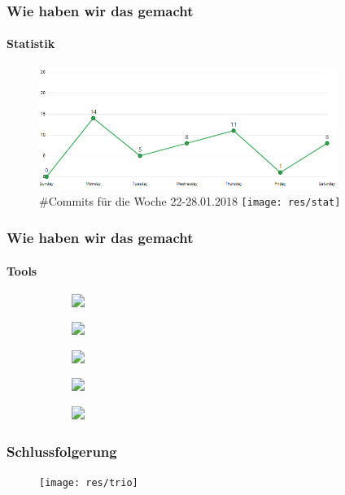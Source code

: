 \documentclass{beamer}
\begin{document}
\begin{frame}
	
	\frametitle{Wie haben wir das gemacht}
	\framesubtitle{Statistik}
	\begin{figure}
		
		\includegraphics[width=.8\textwidth, height = 4cm]{res/git_stat}\newline \vspace{0.3cm}
		\#Commits für die Woche 22-28.01.2018
		\texttt{[image: res/stat]}
	\end{figure}
	
\end{frame}
\begin{frame}
	\frametitle{Wie haben wir das gemacht}
	\framesubtitle{Tools}
	\begin{figure} \centering
		\begin{subfigure}[t]{\linewidth}
			\includegraphics<1-4>[width=60mm]{res/eclipse}
		\end{subfigure} %
		
		\begin{subfigure}[t]{\linewidth}    
			\includegraphics<1-4>[width=30mm]{res/pydev}
		\end{subfigure} 
		\vspace{-0.5cm}
		
		\begin{subfigure}[h]{\linewidth}    
			\includegraphics<2-4>[width=40mm, right]{res/latex}
		\end{subfigure} 
		\vspace{-1cm}
		
		\begin{subfigure}[b]{\linewidth}    
			\includegraphics<3-4>[width=40mm]{res/git} 
		\end{subfigure} 
		\vspace{-1cm}
		
		\begin{subfigure}[t]{\linewidth}    
			\includegraphics<4>[width=25mm, center]{res/trello}  
		\end{subfigure} 
	\end{figure}
\end{frame}
\begin{frame}
\frametitle{Schlussfolgerung}
	
\begin{figure}
\texttt{[image: res/trio]}
\end{figure}
\end{frame}

\end{document}
